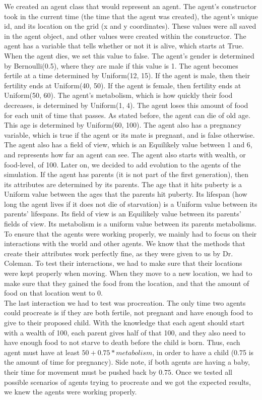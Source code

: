 \documentclass[11pt]{article}
\begin{document}
\begin{multicols}{2}
We created an agent class that would represent an agent. The agent's constructor took in the current time (the time that the agent was created), the agent's unique id, and its location on the grid (x and y coordinates). These values were all saved in the agent object, and other values were created within the constructor. The agent has a variable that tells whether or not it is alive, which starts at True. When the agent dies, we set this value to false. The agent's gender is determined by Bernoulli(0.5), where they are male if this value is 1. The agent becomes fertile at a time determined by Uniform(12, 15). If the agent is male, then their fertility ends at Uniform(40, 50). If the agent is female, then fertility ends at Uniform(50, 60). The agent's metabolism, which is how quickly their food decreases, is determined by Uniform(1, 4). The agent loses this amount of food for each unit of time that passes. As stated before, the agent can die of old age. This age is determined by Uniform(60, 100). The agent also has a pregnancy variable, which is true if the agent or its mate is pregnant, and is false otherwise. The agent also has a field of view, which is an Equilikely value between 1 and 6, and represents how far an agent can see.
The agent also starts with wealth, or food-level, of 100.
\newline
Later on, we decided to add evolution to the agents of the simulation. If the agent has parents (it is not part of the first generation), then its attributes are determined by its parents. The age that it hits puberty is a Uniform value between the ages that the parents hit puberty. Its lifespan (how long the agent lives if it does not die of starvation) is a Uniform value between its parents' lifespans. Its field of view is an Equilikely value between its parents' fields of view. Its metabolism is a uniform value between its parents metabolisms.
\newline
To ensure that the agents were working properly, we mainly had to focus on their interactions with the world and other agents. We know that the methods that create their attributes work perfectly fine, as they were given to us by Dr. Coleman. To test their interactions, we had to make sure that their locations were kept properly when moving. When they move to a new location, we had to make sure that they gained the food from the location, and that the amount of food on that location went to 0.\\
The last interaction we had to test was procreation. The only time two agents could procreate is if they are both fertile, not pregnant and have enough food to give to their proposed child. With the knowledge that each agent should start with a wealth of 100, each parent gives half of that 100, and they also need to have enough food to not starve to death before the child is born. Thus, each agent must have at least $50 + 0.75 * metabolism$, in order to have a child (0.75 is the amount of time for pregnancy). Side note, if both agents are having a baby, their time for movement must be pushed back by $0.75$. Once we tested all possible scenarios of agents trying to procreate and we got the expected results, we knew the agents were working properly.

\end{multicols}
\end{document}
